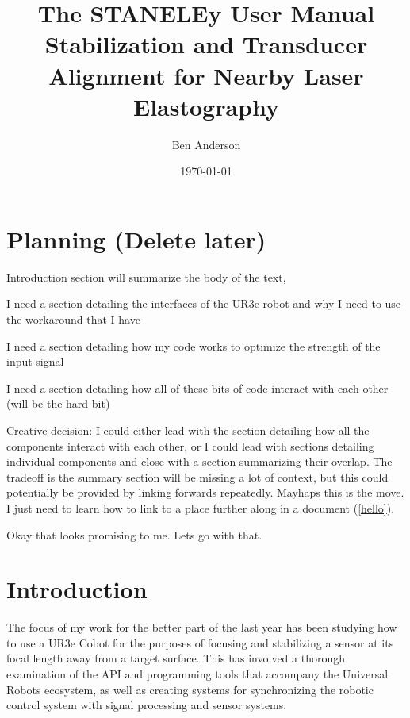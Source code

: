 \documentclass[11pt]{article}
\date{\today}
\author{Ben Anderson}
\title{The STANELEy User Manual \\[1ex] \large Stabilization and Transducer Alignment for Nearby Laser Elastography}
\begin{document}
\newcommand\connect[2]{\path[draw,arrow] (#1) |- ($(#1)!1/2!(#2)$) -| (#2)}

\maketitle
\tableofcontents
\parskip=6pt

\section{Planning (Delete later)}
Introduction section will summarize the body of the text,

I need a section detailing the interfaces of the UR3e robot and why I need to use the workaround that I have

I need a section detailing how my code works to optimize the strength of the input signal

I need a section detailing how all of these bits of code interact with each other (will be the hard bit)

Creative decision: I could either lead with the section detailing how all the components interact with each other, or I could lead with sections detailing individual components and close with a section summarizing their overlap. The tradeoff is the summary section will be missing a lot of context, but this could potentially be provided by linking forwards repeatedly. Mayhaps this is the move. I just need to learn how to link to a place further along in a document (\autoref{hello}).

Okay that looks promising to me. Lets go with that.

\section{Introduction}\label{hello}

The focus of my work for the better part of the last year has been studying how to use a UR3e Cobot for the purposes of focusing and stabilizing a sensor at its focal length away from a target surface. This has involved a thorough examination of the API and programming tools that accompany the Universal Robots ecosystem, as well as creating systems for synchronizing the robotic control system with signal processing and sensor systems.
\end{document}
